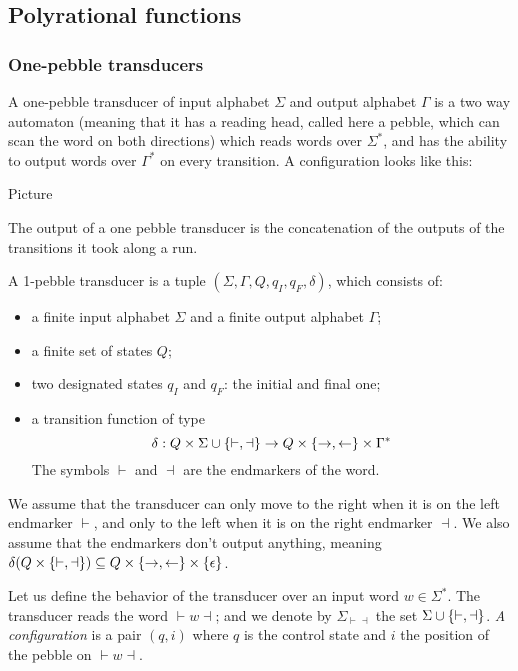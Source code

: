 \subsection{Polyrational functions}

\subsubsection{One-pebble transducers}
A one-pebble transducer of input alphabet $\Sigma$ and output alphabet $\Gamma$ is a two way automaton (meaning that it has a reading head, called here a pebble, which can scan the word on both directions) which reads words over $\Sigma^*$, and has the ability to output words over $\Gamma^*$ on every transition. A configuration looks like this:
\begin{center}
Picture
\end{center} 
The output of a one pebble transducer is the concatenation of the outputs of the transitions it took along a run.

\begin{definition}\label{def:1pebble}
A 1-pebble transducer is a tuple $(\Sigma,\Gamma, Q, q_I, q_F, \delta)$, which consists of:
\begin{itemize}
\item a finite input alphabet $\Sigma$ and a finite output alphabet $\Gamma$; 
\item a finite set of states $Q$;
\item two designated states $q_I$ and $q_F$: the initial and final one;
\item  a transition function of type 
$$\delta : Q\times \Sigma\cup\{\vdash,\dashv\} \to Q\times\{\rightarrow,\leftarrow\}\times\Gamma^*$$
The symbols  $\vdash$ and $\dashv$ are the endmarkers of the word. 
\end{itemize}
We assume that the transducer can only move to the right when it is on the left endmarker $\vdash$, and only to the left when  it is on the right endmarker $\dashv$. We also assume that the endmarkers don't output anything, meaning  $\delta(Q\times\{\vdash,\dashv\})\subseteq Q\times\{\rightarrow,\leftarrow\}\times \{\epsilon\}$.
 \end{definition}


Let us define the behavior of the transducer over an input word $w\in\Sigma^*$. The transducer reads the word ${\vdash} w{\dashv}$; and we denote by $\Sigma_{\vdash\dashv}$ the set  $\Sigma\cup\{\vdash,\dashv\}$. \emph{A configuration} is a pair $(q,i)$ where $q$ is the control state and $i$ the position of the pebble on ${\vdash} w{\dashv}$. 

